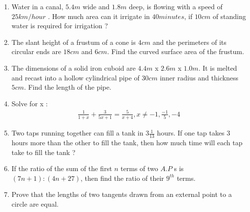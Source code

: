 \documentclass{article}
\providecommand{\brak}[1]{\ensuremath{\left(#1\right)}}
\begin{document}
\begin{enumerate}
																																									    \item Water in a canal, $5.4 m$ wide and $1.8 m$ deep, is flowing with a speed of $25 km/hour$ . How much area can it irrigate in $40 minutes$, if $10 cm$ of standing water is required for irrigation ?
																																										        
																																										        \item The slant height of a frustum of a cone is $4 cm$ and the perimeters of its circular ends are $18 cm$ and $6 cm$. Find the curved surface area of the frustum.
																																												    
																																												    \item The dimensions of a solid iron cuboid are $4.4 m$ x $2.6 m$ x $1.0 m $. It is melted and recast into a hollow cylindrical pipe of $30 cm$ inner radius and thickness $5 cm$. Find the length of the pipe.
																																													        
																																													        \item Solve for x :
																																															    \begin{align*}
																																																            \frac{1}{1+x} + \frac{3}{5x+1} = \frac{5}{x+4} , 
																																																	             x \neq -1, \frac{-1}{5}, -4
																																																		         \end{align*}
																																																			     
																																																			         \item Two taps running together can fill a tank in $3\frac{1}{13}$ hours. If one tap takes $3$ hours more than the other to fill the tank, then how much time will each tap take to fill the tank ?
																																																					     
																																																					     \item If the ratio of the sum of the first $n$ terms of two $A.P$ s is $\brak{7n + 1} : \brak{4n + 27}$, then find the ratio of their $9^{th}$ terms.
																																																						         
																																																						         \item Prove that the lengths of two tangents drawn from an external point to a circle are equal.
																																																								     

\end{enumerate}
\end{document}
